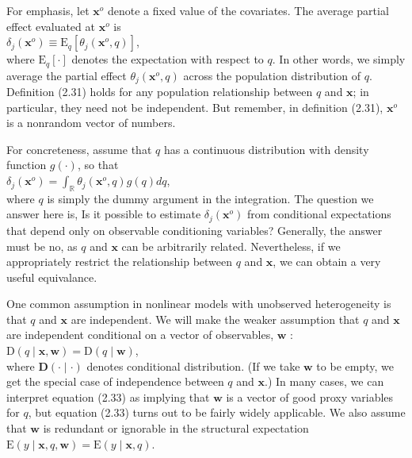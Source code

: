\documentclass[10pt]{article}
\begin{document}
For emphasis, let $\mathbf{x}^{o}$ denote a fixed value of the covariates. The average partial effect evaluated at $\mathbf{x}^{o}$ is\\
$\delta_{j}\left(\mathbf{x}^{o}\right) \equiv \mathrm{E}_{q}\left[\theta_{j}\left(\mathbf{x}^{o}, q\right)\right]$,\\
where $\mathrm{E}_{q}[\cdot]$ denotes the expectation with respect to $q$. In other words, we simply average the partial effect $\theta_{j}\left(\mathbf{x}^{o}, q\right)$ across the population distribution of $q$. Definition (2.31) holds for any population relationship between $q$ and $\mathbf{x}$; in particular, they need not be independent. But remember, in definition (2.31), $\mathbf{x}^{o}$ is a nonrandom vector of numbers.

For concreteness, assume that $q$ has a continuous distribution with density function $g(\cdot)$, so that\\
$\delta_{j}\left(\mathbf{x}^{o}\right)=\int_{\mathbb{R}} \theta_{j}\left(\mathbf{x}^{o}, q\right) g(q) d q$,\\
where $q$ is simply the dummy argument in the integration. The question we answer here is, Is it possible to estimate $\delta_{j}\left(\mathbf{x}^{o}\right)$ from conditional expectations that depend only on observable conditioning variables? Generally, the answer must be no, as $q$ and $\mathbf{x}$ can be arbitrarily related. Nevertheless, if we appropriately restrict the relationship between $q$ and $\mathbf{x}$, we can obtain a very useful equivalance.

One common assumption in nonlinear models with unobserved heterogeneity is that $q$ and $\mathbf{x}$ are independent. We will make the weaker assumption that $q$ and $\mathbf{x}$ are independent conditional on a vector of observables, $\mathbf{w}$ :\\
$\mathrm{D}(q \mid \mathbf{x}, \mathbf{w})=\mathrm{D}(q \mid \mathbf{w})$,\\
where $\mathbf{D}(\cdot \mid \cdot)$ denotes conditional distribution. (If we take $\mathbf{w}$ to be empty, we get the special case of independence between $q$ and $\mathbf{x}$.) In many cases, we can interpret equation (2.33) as implying that $\mathbf{w}$ is a vector of good proxy variables for $q$, but equation (2.33) turns out to be fairly widely applicable. We also assume that $\mathbf{w}$ is redundant or ignorable in the structural expectation\\
$\mathrm{E}(y \mid \mathbf{x}, q, \mathbf{w})=\mathrm{E}(y \mid \mathbf{x}, q)$.
\end{document}
